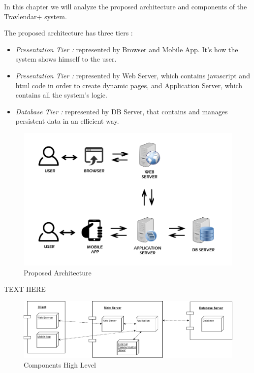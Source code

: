 \vspace*{-5mm}

In this chapter we will analyze the proposed architecture and components of the Travlendar+ system.\par
The proposed architecture has three tiers :
\begin{itemize}
	\setlength{\leftskip}{0.5cm}
	\item \emph{Presentation Tier : }represented by Browser and Mobile App. It's how the system shows himself to the user.
	\item \emph{Presentation Tier : }represented by Web Server, which contains javascript and html code in order to create dynamic pages, and Application Server, which contains all the system's logic.
	\item \emph{Database Tier : }represented by DB Server, that contains and manages persistent data in an efficient way.
\end{itemize}
\begin{figure}[H]
	\centering
	\includegraphics[scale=0.4]{Images/Architecture/Proposed_Architecture}
	\caption{Proposed Architecture}
\end{figure}


TEXT HERE

\begin{figure}[H]
	\centering
	\includegraphics[scale=0.4]{Images/Architecture/Components_High_Level}
	\caption{Components High Level}
\end{figure}

